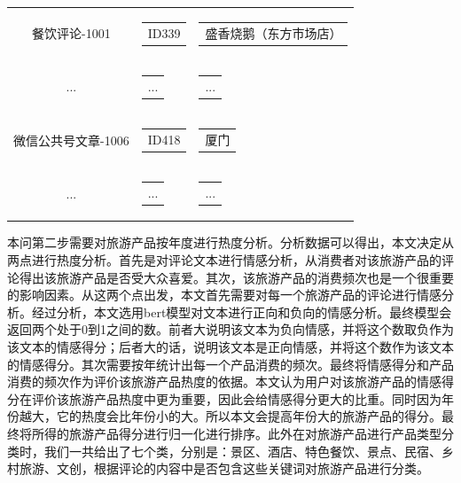 \documentclass[bwprint]{gmcmthesis}
\begin{document}
\begin{center}
\begin{longtable}{c|c|c}
            餐饮评论-1001 & \begin{tabular}[c]{@{}c@{}}
              ID339
              \end{tabular} 
              & \begin{tabular}[c]{@{}l@{}}
                盛香烧鹅（东方市场店）
              \end{tabular} \\
              ... & \begin{tabular}[c]{@{}c@{}}
                ...
              \end{tabular} 
              & \begin{tabular}[c]{@{}l@{}}
                ...
              \end{tabular} \\
              微信公共号文章-1006 & \begin{tabular}[c]{@{}c@{}}
                ID418
                \end{tabular} 
                & \begin{tabular}[c]{@{}l@{}}
                  厦门
                \end{tabular} \\
                ... & \begin{tabular}[c]{@{}c@{}}
                  ...
                \end{tabular} 
                & \begin{tabular}[c]{@{}l@{}}
                  ...
                \end{tabular} \\
      \hline
  \end{longtable}
  \end{center}

  本问第二步需要对旅游产品按年度进行热度分析。分析数据可以得出，本文决定从两点进行热度分析。首先是对评论文本进行情感分析，从消费者对该旅游产品的评论得出该旅游产品是否受大众喜爱。其次，该旅游产品的消费频次也是一个很重要的影响因素。从这两个点出发，本文首先需要对每一个旅游产品的评论进行情感分析。经过分析，本文选用bert模型对文本进行正向和负向的情感分析。最终模型会返回两个处于0到1之间的数。前者大说明该文本为负向情感，并将这个数取负作为该文本的情感得分；后者大的话，说明该文本是正向情感，并将这个数作为该文本的情感得分。其次需要按年统计出每一个产品消费的频次。最终将情感得分和产品消费的频次作为评价该旅游产品热度的依据。本文认为用户对该旅游产品的情感得分在评价该旅游产品热度中更为重要，因此会给情感得分更大的比重。同时因为年份越大，它的热度会比年份小的大。所以本文会提高年份大的旅游产品的得分。最终将所得的旅游产品得分进行归一化进行排序。此外在对旅游产品进行产品类型分类时，我们一共给出了七个类，分别是：景区、酒店、特色餐饮、景点、民宿、乡村旅游、文创，根据评论的内容中是否包含这些关键词对旅游产品进行分类。
\end{document}
